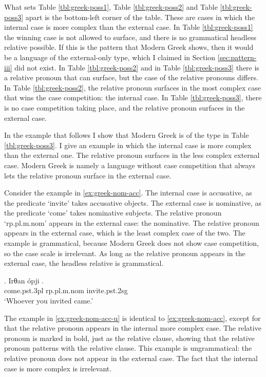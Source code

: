 What sets Table \ref{tbl:greek-poss1}, Table \ref{tbl:greek-poss2} and Table \ref{tbl:greek-poss3} apart is the bottom-left corner of the table. These are cases in which the internal case is more complex than the external case.
In Table \ref{tbl:greek-poss1} the winning case is not allowed to surface, and there is no grammatical headless relative possible. If this is the pattern that Modern Greek shows, then it would be a language of the external-only type, which I claimed in Section \ref{sec:pattern-iii} did not exist.
In Table \ref{tbl:greek-poss2} and in Table \ref{tbl:greek-poss3} there is a relative pronoun that can surface, but the case of the relative pronouns differs. In Table \ref{tbl:greek-poss2}, the relative pronoun surfaces in the most complex case that wins the case competition: the internal case. In Table \ref{tbl:greek-poss3}, there is no case competition taking place, and the relative pronoun surfaces in the external case.

In the example that follows I show that Modern Greek is of the type in Table \ref{tbl:greek-poss3}. I give an example in which the internal case is more complex than the external one. The relative pronoun surfaces in the less complex external case. Modern Greek is namely a language without case competition that always lets the relative pronoun surface in the external case.

Consider the example in \ref{ex:greek-nom-acc}.
The internal case is accusative, as the predicate  `invite' takes accusative objects.
The external case is nominative, as the predicate  `come' takes nominative subjects.
The relative pronoun  `\ac{rp}.\ac{pl}.\ac{m}.\ac{nom}' appears in the external case: the nominative.
The relative pronoun appears in the external case, which is the least complex case of the two. The example is grammatical, because Modern Greek does not show case competition, so the case scale is irrelevant. As long as the relative pronoun appears in the external case, the headless relative is grammatical.

\exg. Irθan ópji .\\
come.\ac{pst}.3\ac{pl}\scsub{[nom]} \ac{rp}.\ac{pl}.\ac{m}.\ac{nom} invite.\ac{pst}.2\ac{sg}\scsub{[acc]}\\
`Whoever you invited came.'\label{ex:greek-nom-acc}

The example in \ref{ex:greek-nom-acc-u} is identical to \ref{ex:greek-nom-acc}, except for that the relative pronoun appears in the internal more complex case.
The relative pronoun is marked in bold, just as the relative clause, showing that the relative pronoun patterns with the relative clause.
This example is ungrammatical: the relative pronoun does not appear in the external case. The fact that the internal case is more complex is irrelevant.

